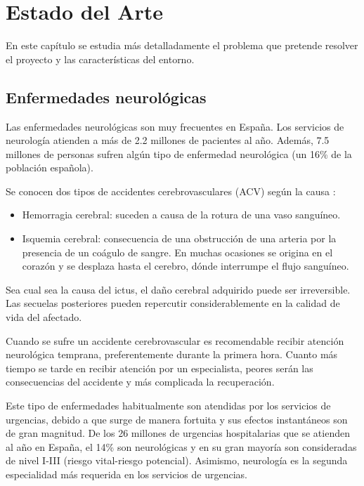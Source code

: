 \chapter{Estado del Arte\label{sec:estado_del_arte}}

En este capítulo se estudia más detalladamente el problema que pretende resolver el proyecto y las características del entorno.

 
\section{Enfermedades neurológicas}
\label{sec:dolencias2}

Las enfermedades neurológicas son muy frecuentes en España. Los servicios de neurología atienden a más de 2.2 millones de pacientes al año. Además, 7.5 millones de personas sufren algún tipo de enfermedad neurológica (un 16\% de la población española).  

\clearpage
 

Se conocen dos tipos de accidentes cerebrovasculares (ACV) según la causa \cite{tipoIctus}:
\begin{itemize}
	\item Hemorragia cerebral: suceden  a causa de la rotura de una vaso sanguíneo.
	\item Isquemia cerebral: consecuencia de una obstrucción de una arteria por la presencia de un coágulo de sangre. En muchas ocasiones se origina en el corazón y se desplaza hasta el cerebro, dónde interrumpe el flujo sanguíneo.
\end{itemize}

Sea cual sea la causa del ictus, el daño cerebral adquirido puede ser irreversible. Las secuelas posteriores pueden repercutir considerablemente en la calidad de vida del afectado.

Cuando se sufre un accidente cerebrovascular es recomendable recibir atención neurológica temprana, preferentemente durante la primera hora. Cuanto más tiempo se tarde en recibir atención por un especialista, peores serán las consecuencias del accidente y más complicada la recuperación.

Este tipo de enfermedades habitualmente son atendidas por los servicios de urgencias, debido a que surge de manera fortuita y sus efectos instantáneos son de gran magnitud. De los 26 millones de urgencias hospitalarias que se atienden al año en España, el 14\% son neurológicas y en su gran mayoría son consideradas de nivel I-III (riesgo vital-riesgo potencial). Asimismo, neurología es la segunda especialidad más requerida en los servicios de urgencias.

